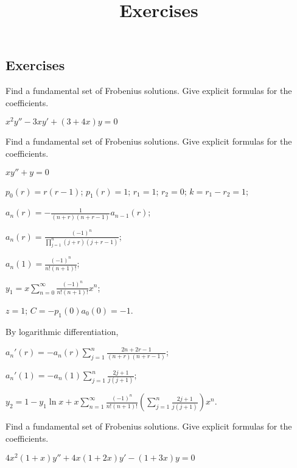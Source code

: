\documentclass{ximera}
\title{Exercises} \license{CC BY-NC-SA 4.0}
\begin{document}
\begin{abstract}
\end{abstract}
\maketitle

\begin{onlineOnly}
\section*{Exercises}
\end{onlineOnly}


\begin{problem}\label{exer:7.7.1}
Find
a fundamental set  of Frobenius solutions. Give explicit formulas for
the coefficients.

$x^2y''-3xy'+(3+4x)y=0$
\end{problem}


\begin{problem}\label{exer:7.7.2}
Find
a fundamental set  of Frobenius solutions. Give explicit formulas for
the coefficients.

$xy''+y=0$

\begin{solution}
    $p_0(r)=r(r-1)$;
$p_1(r)=1$;
$r_1=1$; $r_2=0$; $k=r_1-r_2=1$;

$a_n(r)=-\frac{1}{(n+r)(n+r-1)}
a_{n-1}(r)$;


 $a_n(r)=\frac{(-1)^n}{\prod_{j=1}^n(j+r)(j+r-1)}$;

$a_n(1)=\frac{(-1)^n}{ n!(n+1)!}$;

$y_1=x\sum_{n=0}^\infty\frac{(-1)^n}{ n!(n+1)!}x^n$;

$z=1$; $C=-p_1(0)a_0(0)=-1$.

By logarithmic differentiation,

$a_n'(r)=-a_n(r)\sum_{j=1}^n\frac{2n+2r-1}{(n+r)(n+r-1)}$;

$a_n'(1)=-a_n(1)\sum_{j=1}^n\frac{2j+1}{ j(j+1)}$;

$y_2=1-y_1\ln x
+x\sum_{n=1}^\infty\frac{(-1)^n}{
n!(n+1)!}\left(\sum_{j=1}^n\frac{2j+1}{ j(j+1)}\right)x^n$.
\end{solution}
\end{problem}

\begin{problem}\label{exer:7.7.3}
Find
a fundamental set  of Frobenius solutions. Give explicit formulas for
the coefficients.

$4x^2(1+x)y''+4x(1+2x)y'-(1+3x)y=0$
\end{problem}
\end{document}
